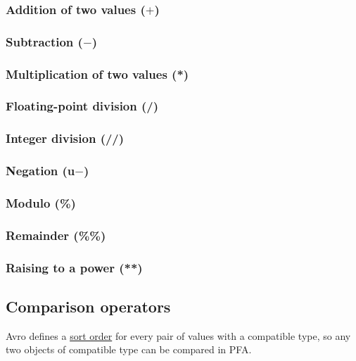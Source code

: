 \documentclass{article}
\theoremstyle{definition}
\begin{document}
\subsubsection{Addition of two values ($+$)}
\libfcn{+}

\subsubsection{Subtraction ($-$)}
\libfcn{-}

\subsubsection{Multiplication of two values (*)}
\libfcn{*}

\subsubsection{Floating-point division (/)}
\libfcn{/}

\subsubsection{Integer division (//)}
\libfcn{//}

\subsubsection{Negation (u$-$)}

\subsubsection{Modulo (\%)}
\libfcn{\%}

\subsubsection{Remainder (\%\%)}
\libfcn{\%\%}

\subsubsection{Raising to a power (**)}
\libfcn{**}

\subsection{Comparison operators}

Avro defines a \href{http://avro.apache.org/docs/1.7.6/spec.html#order}{sort order} for every pair of values with a compatible type, so any two objects of compatible type can be compared in PFA.
\end{document}
